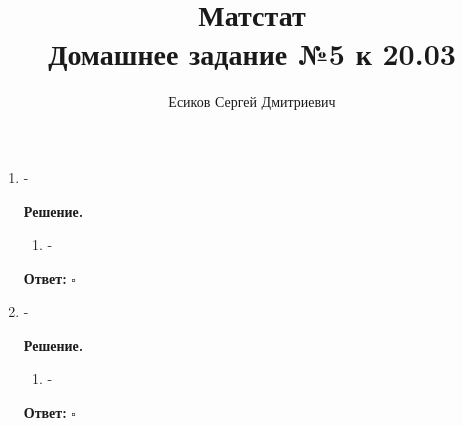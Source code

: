 \documentclass[12pt]{article}
\title{\textbf{Матстат}\\Домашнее задание №5 к 20.03}
\author{Есиков Сергей Дмитриевич}
\newenvironment{solution}{\textbf{Решение.}\par}{\hfill\(\square\)}
\newcommand{\answer}[1]{\textbf{Ответ:} \boxed{#1}}
\begin{document}
\maketitle

\begin{enumerate}[label=\textbf{\arabic*.}, left=0pt]
    \item -
          
    \begin{solution}
              \begin{enumerate}
                  \item -
              \end{enumerate}
              \answer{-}
          \end{solution}
    
    \item -
          
    \begin{solution}
              \begin{enumerate}
                  \item -
              \end{enumerate}
              \answer{-}
          \end{solution}
\end{enumerate}
\end{document}
